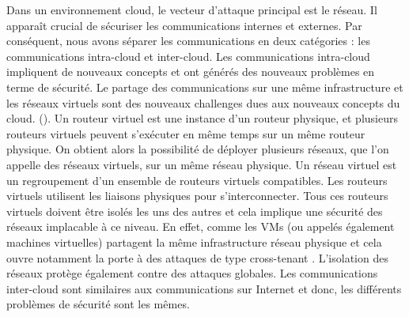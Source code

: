Dans un environnement cloud, le vecteur d'attaque principal est le réseau. Il apparaît crucial de sécuriser les communications internes et externes. Par conséquent, nous avons séparer les communications en deux catégories : les communications intra-cloud et inter-cloud.
Les communications intra-cloud impliquent de nouveaux concepts et ont générés
des nouveaux problèmes en terme de sécurité.
Le partage des communications sur une même
infrastructure et les réseaux virtuels sont des nouveaux challenges
dues aux nouveaux concepts du cloud. (\cite{security_cloud_survey}). Un routeur
virtuel est une instance d'un routeur physique, et plusieurs routeurs virtuels
peuvent s'exécuter en même temps sur un même routeur physique. On obtient alors
la possibilité de déployer plusieurs réseaux, que l'on appelle des réseaux
virtuels, sur un même réseau physique. Un réseau virtuel est un regroupement
d'un ensemble de routeurs virtuels compatibles. Les routeurs virtuels utilisent
les liaisons physiques pour s'interconnecter. Tous ces routeurs virtuels
doivent être isolés les uns des autres et cela implique une sécurité des
réseaux implacable à ce niveau. En effet, comme les \gls{VMs} (ou appelés
également machines virtuelles) partagent la même infrastructure réseau physique
et cela ouvre notamment la porte à des attaques de type cross-tenant
\cite{new_attack_cloud}. L'isolation des réseaux protège également contre des
attaques globales.
Les communications inter-cloud sont similaires
	aux communications sur Internet et donc, les différents problèmes de
	sécurité sont les mêmes.

